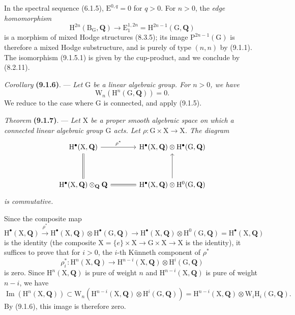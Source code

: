 \documentclass[11pt,leqno]{article}
\newcommand{\Page}[1]{\ifvmode\noindent\else\unskip\ \fi{\footnotesize\textcolor{gray}{[p.\,#1]}}\ \ignorespaces}
\begin{document}
In the spectral sequence (6.1.5), \(\mathrm{E}^{0,q}=0\) for \(q>0\). For \(n>0\), the \textit{edge homomorphism}
\[
\mathrm{H}^{2n}(\mathrm{B}_{\mathrm{G}},\mathbf{Q})
\to\mathrm{E}_{1}^{1,2n}
=\mathrm{H}^{2n-1}(\mathrm{G},\mathbf{Q})
\]
is a morphism of mixed Hodge structures (8.3.5); its image \(\mathrm{P}^{2n-1}(\mathrm{G})\) is therefore a mixed Hodge substructure, and is purely of type \((n,n)\) by (9.1.1). The isomorphism (9.1.5.1) is given by the cup-product, and we conclude by (8.2.11).

\textit{Corollary} \textbf{(9.1.6)}. — \textit{Let \(\mathrm{G}\) be a linear algebraic group. For \(n>0\), we have}
\[
\mathrm{W}_{n}(\mathrm{H}^{n}(\mathrm{G},\mathbf{Q}))=0.
\]
We reduce to the case where \(\mathrm{G}\) is connected, and apply (9.1.5).

\textit{Theorem} \textbf{(9.1.7)}. — \textit{Let \(\mathrm{X}\) be a proper smooth algebraic space on which a connected linear algebraic group \(\mathrm{G}\) acts. Let \(\rho:\mathrm{G}\times\mathrm{X}\to\mathrm{X}\). The diagram}
\Page{47}
\[
\begin{tikzcd}[ampersand replacement=\&, column sep=large, row sep=3.5em]
\mathrm{H}^{\bullet}(\mathrm{X},\mathbf{Q})
  \arrow[r, "\rho^{*}"] \arrow[d, equal]
\&
\mathrm{H}^{\bullet}(\mathrm{X},\mathbf{Q})\otimes
\mathrm{H}^{\bullet}(\mathrm{G},\mathbf{Q})
\\
\mathrm{H}^{\bullet}(\mathrm{X},\mathbf{Q})\otimes_{\mathbf{Q}}\mathbf{Q}
  \arrow[r, equal]
\&
\mathrm{H}^{\bullet}(\mathrm{X},\mathbf{Q})\otimes
\mathrm{H}^{0}(\mathrm{G},\mathbf{Q})
  \arrow[u]
\end{tikzcd}
\]
\textit{is commutative.}

Since the composite map
\[
\mathrm{H}^{\bullet}(\mathrm{X},\mathbf{Q})
\xrightarrow{\rho^{*}}
\mathrm{H}^{\bullet}(\mathrm{X},\mathbf{Q})\otimes\mathrm{H}^{\bullet}(\mathrm{G},\mathbf{Q})
\to
\mathrm{H}^{\bullet}(\mathrm{X},\mathbf{Q})\otimes\mathrm{H}^{0}(\mathrm{G},\mathbf{Q})
=\mathrm{H}^{\bullet}(\mathrm{X},\mathbf{Q})
\]
is the identity (the composite \(\mathrm{X}=\{e\}\times\mathrm{X}\to\mathrm{G}\times\mathrm{X}\to\mathrm{X}\) is the identity), it suffices to prove that for \(i>0\), the \(i\)-th Künneth component of \(\rho^{*}\)
\[
\rho_{i}^{*}:\mathrm{H}^{n}(\mathrm{X},\mathbf{Q})
\to
\mathrm{H}^{n-i}(\mathrm{X},\mathbf{Q})\otimes\mathrm{H}^{i}(\mathrm{G},\mathbf{Q})
\]
is zero. Since \(\mathrm{H}^{n}(\mathrm{X},\mathbf{Q})\) is pure of weight \(n\) and \(\mathrm{H}^{n-i}(\mathrm{X},\mathbf{Q})\) is pure of weight \(n-i\), we have
\[
\operatorname{Im}(\mathrm{H}^{n}(\mathrm{X},\mathbf{Q}))
\subset
\mathrm{W}_{n}(\mathrm{H}^{n-i}(\mathrm{X},\mathbf{Q})\otimes\mathrm{H}^{i}(\mathrm{G},\mathbf{Q}))
=
\mathrm{H}^{n-i}(\mathrm{X},\mathbf{Q})\otimes\mathrm{W}_{i}\mathrm{H}_{i}(\mathrm{G},\mathbf{Q}).
\]
By (9.1.6), this image is therefore zero.
\end{document}
